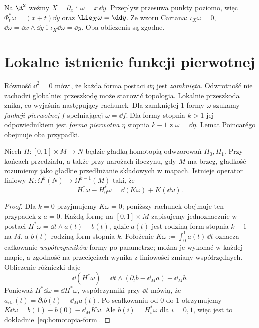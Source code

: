 \begin{przyklad}
Na $\R^2$ weźmy $X=\partial_x$ i $\omega=x\,\dd y$.
Przepływ przesuwa punkty poziomo, więc
$\Phi_t^*\omega=(x+t)\dd y$ oraz
$\Lie_X\omega=\dd y$. Ze wzoru Cartana:
$\iota_X\omega=0$, $\dd\omega=\dd x\wedge\dd y$
i $\iota_X\dd\omega=\dd y$. Oba obliczenia są zgodne.
\end{przyklad}
\section{Lokalne istnienie funkcji pierwotnej}
\label{sec:formy-poincare}

Równość $\dd^2=0$ mówi, że każda forma postaci
$\dd\eta$ jest \emph{zamknięta}. Odwrotność nie zachodzi
globalnie: przeszkodę może stanowić topologia. Lokalnie
przeszkoda znika, co wyjaśnia następujący rachunek.
Dla zamkniętej $1$-formy $\omega$ szukamy \emph{funkcji
pierwotnej} $f$ spełniającej $\omega=\dd f$.
Dla formy stopnia $k>1$ jej odpowiednikiem jest
\emph{forma pierwotna} $\eta$ stopnia $k-1$ z
$\omega=\dd\eta$. Lemat Poincarégo obejmuje
oba przypadki.

\begin{lemat}
\label{lem:homotopia-form}
Niech $H:[0,1]\times M\to N$ będzie gładką homotopią
odwzorowań $H_0,H_1$. Przy końcach przedziału, a także
przy narożach iloczynu, gdy $M$ ma brzeg, gładkość
rozumiemy jako gładkie przedłużanie składowych w mapach. Istnieje operator liniowy
$K:\Omega^k(N)\to\Omega^{k-1}(M)$ taki, że
\begin{equation}\label{eq:homotopia-form}
 H_1^*\omega-H_0^*\omega
 =\dd(K\omega)+K(\dd\omega).
\end{equation}
\end{lemat}
\begin{proof}
Dla $k=0$ przyjmujemy $K\omega=0$; poniższy rachunek
obejmuje ten przypadek z $a=0$. Każdą formę na
$[0,1]\times M$ zapisujemy jednoznacznie
w postaci $H^*\omega=\dd t\wedge a(t)+b(t)$,
gdzie $a(t)$ jest rodziną form stopnia $k-1$ na $M$,
a $b(t)$ rodziną form stopnia $k$. Położenie
$K\omega:=\int_0^1 a(t)\,\dd t$ oznacza całkowanie
\emph{współczynników} formy po parametrze; można je
wykonać w każdej mapie, a zgodność na przecięciach
wynika z liniowości zmiany współrzędnych.
Obliczenie różniczki daje
\[
 \dd(H^*\omega)
 =\dd t\wedge(\partial_tb-\dd_Ma)+\dd_Mb.
\]
Ponieważ $H^*\dd\omega=\dd H^*\omega$, współczynniki
przy $\dd t$ mówią, że
$a_{\dd\omega}(t)=\partial_tb(t)-\dd_Ma(t)$.
Po scałkowaniu od $0$ do $1$ otrzymujemy
$K\dd\omega=b(1)-b(0)-\dd_MK\omega$.
Ale $b(i)=H_i^*\omega$ dla $i=0,1$,
więc jest to dokładnie~\eqref{eq:homotopia-form}.
\end{proof}

